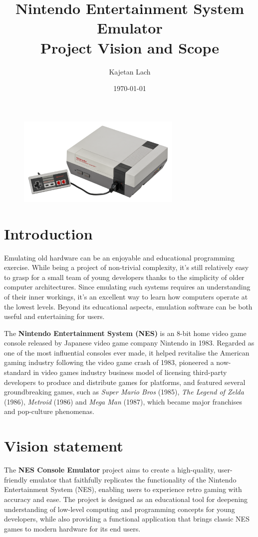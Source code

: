 \documentclass{article}
\title{%
\vspace{-2.5cm}
\textbf{Nintendo Entertainment System Emulator}\\
Project Vision and Scope
}
\date{\today}
\author{Kajetan Lach}
\begin{document}
\maketitle

\begin{figure}[h]
    \centering
    \includegraphics[width=0.7\textwidth]{NES.png}
\end{figure}

\section{Introduction}
Emulating old hardware can be an enjoyable and educational programming exercise. While being a project of non-trivial complexity, it's still relatively easy to grasp for a small team of young developers thanks to the simplicity of older computer architectures. Since emulating such systems requires an understanding of their inner workings, it's an excellent way to learn how computers operate at the lowest levels. Beyond its educational aspects, emulation software can be both useful and entertaining for users.

The \textbf{Nintendo Entertainment System (NES)} is an 8-bit home video game console released by Japanese video game company Nintendo in 1983. Regarded as one of the most influential consoles ever made, it helped revitalise the American gaming industry following the video game crash of 1983, pioneered a now-standard in video games industry business model of licensing third-party developers to produce and distribute games for platforms, and featured several groundbreaking games, such as \textit{Super Mario Bros} (1985), \textit{The Legend of Zelda} (1986), \textit{Metroid} (1986) and \textit{Mega Man} (1987), which became major franchises and pop-culture phenomenas.

\section{Vision statement}
The \textbf{NES Console Emulator} project aims to create a high-quality, user-friendly emulator that faithfully replicates the functionality of the Nintendo Entertainment System (NES), enabling users to experience retro gaming with accuracy and ease. The project is designed as an educational tool for deepening understanding of low-level computing and programming concepts for young developers, while also providing a functional application that brings classic NES games to modern hardware for its end users.
\end{document}
